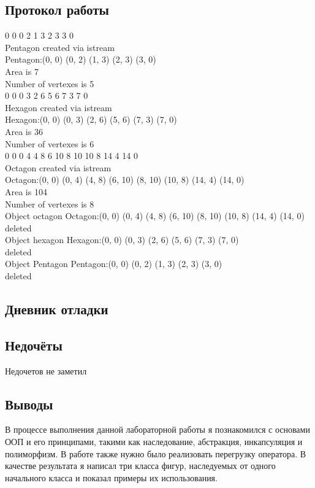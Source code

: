 \documentclass[12pt]{article}
\begin{document}
\subsection*{Протокол работы}
0 0 0 2 1 3 2 3 3 0 \\
Pentagon created via istream \\
Pentagon:(0, 0) (0, 2) (1, 3) (2, 3) (3, 0) \\
Area is 7 \\
Number of vertexes is 5 \\
0 0 0 3 2 6 5 6 7 3 7 0 \\
Hexagon created via istream \\
Hexagon:(0, 0) (0, 3) (2, 6) (5, 6) (7, 3) (7, 0) \\ 
Area is 36 \\
Number of vertexes is 6 \\
0 0 0 4 4 8 6 10 8 10 10 8 14 4 14 0 \\
Octagon created via istream \\
Octagon:(0, 0) (0, 4) (4, 8) (6, 10) (8, 10) (10, 8) (14, 4) (14, 0) \\
Area is 104 \\
Number of vertexes is 8 \\
Object octagon Octagon:(0, 0) (0, 4) (4, 8) (6, 10) (8, 10) (10, 8) (14, 4) (14, 0) \\
deleted \\
Object hexagon Hexagon:(0, 0) (0, 3) (2, 6) (5, 6) (7, 3) (7, 0) \\
deleted \\
Object Pentagon Pentagon:(0, 0) (0, 2) (1, 3) (2, 3) (3, 0) \\
deleted \\

\subsection*{Дневник отладки}


\subsection*{Недочёты}
Недочетов не заметил

\subsection*{Выводы}
В процессе выполнения данной лабораторной работы я познакомился с основами ООП и его принципами, такими как наследование, абстракция, инкапсуляция и полиморфизм. В работе также нужно было реализовать перегрузку оператора. В качестве результата я написал три класса фигур, наследуемых от одного начального класса и показал примеры их использования. 
\end{document}
